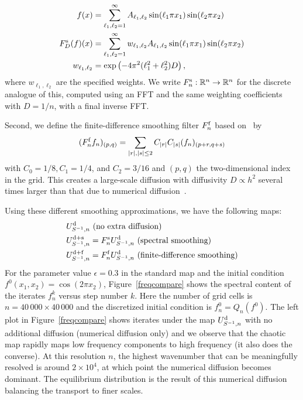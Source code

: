 \documentclass{aims}
\theoremstyle{definition}
\begin{document}
\begin{align}
  f(x) &= \sum_{\ell_1,\ell_2=1}^\infty A_{\ell_1,\ell_2} \sin(\ell_1
  \pi x_1)
  \sin(\ell_2 \pi x_2) \\
  F^{\rm s}_D(f)(x) &= \sum_{\ell_1,\ell_2=1}^\infty w_{\ell_1,\ell_2}
  A_{\ell_1,\ell_2}
  \sin(\ell_1 \pi x_1) \sin(\ell_2 \pi x_2) \\
  w_{\ell_1,\ell_2} &= \exp\left(-4\pi^2(\ell_1^2 + \ell_2^2)
    D\right),
\end{align}
where $w_{\ell_1,\ell_2}$ are the specified weights. We write $F^{\rm
  s}_n : \mathbb{R}^n \to \mathbb{R}^n$ for the discrete analogue of
this, computed using an FFT and the same weighting coefficients with
$D = 1/n$, with a final inverse FFT.

Second, we define the finite-difference smoothing filter $F^{\rm
  f}_n$ based on~\cite{Tsang2005} by
\begin{align}
  \label{smoothingstep}
  (F^{\rm f}_n f_n)_{(p,q)} = \sum_{|r|,|s|\le 2}C_{|r|}C_{|s|}(f_n)_{(p+r,q+s)}
\end{align}
with $C_0=1/8, C_1=1/4$, and $C_2=3/16$ and $(p,q)$ the
two-dimensional index in the grid. This creates a large-scale
diffusion with diffusivity $D \propto h^2$ several times larger than
that due to numerical diffusion~\cite{Tsang2005}.

Using these different smoothing approximations, we have the following
maps:
\begin{align}
  \label{eqn:disc_approx_plain}
  U_{S^{-1},n}^{\rm d} & \text{ (no extra diffusion)} \\
  \label{eqn:disc_approx_spectral}
  U_{S^{-1},n}^{\rm d+s} &= F^{\rm s}_n U_{S^{-1},n}^{\rm d} \text{ (spectral smoothing)} \\
  \label{eqn:disc_approx_finitediff}
  U_{S^{-1},n}^{\rm d+f} &= F^{\rm f}_n U_{S^{-1},n}^{\rm d} \text{ (finite-difference smoothing)}
\end{align}
For the parameter value $\epsilon = 0.3$ in the standard map and the
initial condition $f^0(x_1,x_2)=\cos(2\pi x_2)$,
Figure~\ref{freqcompare} shows the spectral content of the iterates
$f_n^k$ versus step number $k$. Here the number of grid cells is
$n=40\,000 \times 40\,000$ and the discretized initial condition is
$f_n^0 = Q_n(f^0)$. The left plot in Figure~\ref{freqcompare} shows
iterates under the map $U_{S^{-1},n}^{\rm d}$ with no additional
diffusion (numerical diffusion only) and we observe that the chaotic
map rapidly maps low frequency components to high frequency (it also
does the converse). At this resolution $n$, the highest wavenumber
that can be meaningfully resolved is around $2 \times 10^4$, at which
point the numerical diffusion becomes dominant. The equilibrium
distribution is the result of this numerical diffusion balancing the
transport to finer scales.
\end{document}
